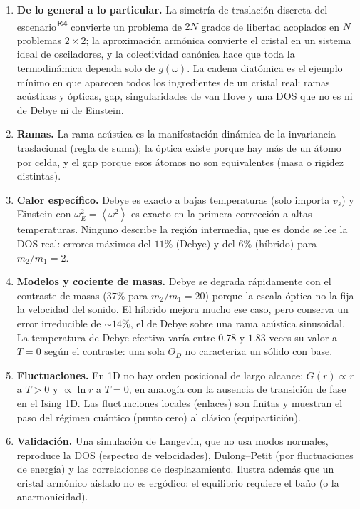 \documentclass[11pt,a4paper]{article}
\newcommand{\Eesc}{escenario\textsuperscript{\textcolor{eesc}{\textbf{E4}}}}
\newcommand{\avg}[1]{\left\langle #1\right\rangle}
\newcommand{\vs}{v_{s}}
\begin{document}
\begin{enumerate}
\item \textbf{De lo general a lo particular.} La simetría de traslación
  discreta del \Eesc{} convierte un problema de $2N$ grados de libertad
  acoplados en $N$ problemas $2\times2$; la aproximación armónica convierte el
  cristal en un sistema ideal de osciladores, y la colectividad canónica hace
  que toda la termodinámica dependa solo de $g(\omega)$. La cadena diatómica es
  el ejemplo mínimo en que aparecen todos los ingredientes de un cristal real:
  ramas acústicas y ópticas, gap, singularidades de van Hove y una DOS que no
  es ni de Debye ni de Einstein.
\item \textbf{Ramas.} La rama acústica es la manifestación dinámica de la
  invariancia traslacional (regla de suma); la óptica existe porque hay más de
  un átomo por celda, y el gap porque esos átomos no son equivalentes (masa o
  rigidez distintas).
\item \textbf{Calor específico.} Debye es exacto a bajas temperaturas (solo
  importa $\vs$) y Einstein con $\omega_E^2=\avg{\omega^2}$ es exacto en la
  primera corrección a altas temperaturas. Ninguno describe la región
  intermedia, que es donde se lee la DOS real: errores máximos del $11\%$
  (Debye) y del $6\%$ (híbrido) para $m_2/m_1=2$.
\item \textbf{Modelos y cociente de masas.} Debye se degrada rápidamente con el
  contraste de masas ($37\%$ para $m_2/m_1=20$) porque la escala óptica no la
  fija la velocidad del sonido. El híbrido mejora mucho ese caso, pero conserva
  un error irreducible de $\sim14\%$, el de Debye sobre una rama acústica
  sinusoidal. La temperatura de Debye efectiva varía entre $0.78$ y $1.83$
  veces su valor a $T=0$ según el contraste: una sola $\Theta_D$ no caracteriza
  un sólido con base.
\item \textbf{Fluctuaciones.} En 1D no hay orden posicional de largo alcance:
  $G(r)\propto r$ a $T>0$ y $\propto\ln r$ a $T=0$, en analogía con la
  ausencia de transición de fase en el Ising 1D. Las fluctuaciones locales
  (enlaces) son finitas y muestran el paso del régimen cuántico (punto cero) al
  clásico (equipartición).
\item \textbf{Validación.} Una simulación de Langevin, que no usa modos
  normales, reproduce la DOS (espectro de velocidades), Dulong–Petit (por
  fluctuaciones de energía) y las correlaciones de desplazamiento. Ilustra
  además que un cristal armónico aislado no es ergódico: el equilibrio requiere
  el baño (o la anarmonicidad).
\end{enumerate}
\end{document}
